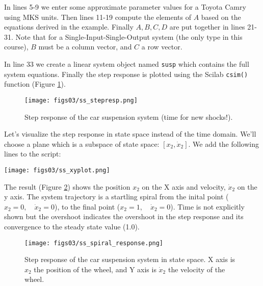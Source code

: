 \documentclass[letterpaper]{book}
\begin{document}
In lines 5-9 we enter some approximate parameter values for a Toyota Camry using MKS units.  Then lines 11-19 compute the elements of $A$ based on the equations derived in the example.  Finally $A,B,C,D$ are put together in lines 21-31.   Note that for a Single-Input-Single-Output system (the only type in this course), $B$ must be a column vector, and $C$ a row vector.  

In line 33 we create a linear system object named {\tt susp} which contains the full system equations.  Finally the step response is plotted using the Scilab {\tt csim()} function 
(Figure \ref{graphsuspensionstep}).

\begin{figure}[b]\centering
\texttt{[image: figs03/ss\_stepresp.png]}
\caption{Step response of the car suspension system (time for new shocks!).}\label{graphsuspensionstep}
\end{figure}

Let's visualize the step response in state space instead of the time domain.   We'll choose 
a plane which is a subspace of state space: $[x_2, \dot{x}_2]$.   We add the following lines
to the script:

\begin{center}
\texttt{[image: figs03/ss\_xyplot.png]}
\end{center}

The result (Figure \ref{graphstatespacespiral}) shows the position $x_2$ on the X axis and velocity,
$\dot{x}_2$ on the y axis.  The system trajectory is a startling spiral from the inital point
($x_2=0, \quad \dot{x}_2=0$), to the final point ($x_2=1, \quad\dot{x}_2=0$).   Time is not explicitly shown but the overshoot indicates the overshoot in the step response and its convergence to the steady state 
value (1.0). 


\begin{figure}[b]\centering
\texttt{[image: figs03/ss\_spiral\_response.png]}
\caption{Step response of the car suspension system in state space.  X axis is $x_2$ the position of the wheel, and Y axis is $\dot{x}_2$ the velocity of the wheel.}\label{graphstatespacespiral}
\end{figure}
\end{document}
